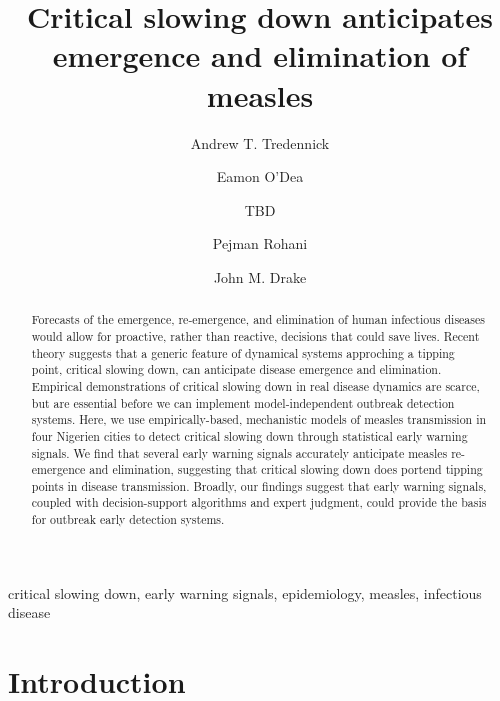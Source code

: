 \documentclass[3p]{elsarticle} %
\begin{document}
\begin{frontmatter}

  \title{Critical slowing down anticipates emergence and elimination of measles}
    \author[a]{Andrew T. Tredennick}
    \author[a]{Eamon O'Dea}
  
  
    \author[a]{TBD}
  
  
    \author[a]{Pejman Rohani}
  
  
    \author[a]{John M. Drake}
  
  
      \address[a]{Odum School of Ecology \& Center for the Ecology of Infectious Diseases,
University of Georgia, Athens, GA, USA}
  
  \begin{abstract}
  Forecasts of the emergence, re-emergence, and elimination of human
  infectious diseases would allow for proactive, rather than reactive,
  decisions that could save lives. Recent theory suggests that a generic
  feature of dynamical systems approching a tipping point, critical
  slowing down, can anticipate disease emergence and elimination.
  Empirical demonstrations of critical slowing down in real disease
  dynamics are scarce, but are essential before we can implement
  model-independent outbreak detection systems. Here, we use
  empirically-based, mechanistic models of measles transmission in four
  Nigerien cities to detect critical slowing down through statistical
  early warning signals. We find that several early warning signals
  accurately anticipate measles re-emergence and elimination, suggesting
  that critical slowing down does portend tipping points in disease
  transmission. Broadly, our findings suggest that early warning signals,
  coupled with decision-support algorithms and expert judgment, could
  provide the basis for outbreak early detection systems.
  \end{abstract}
   \begin{keyword} critical slowing down, early warning signals, epidemiology, measles, infectious disease\end{keyword}
 \end{frontmatter}

\section{Introduction}\label{introduction}
\end{document}
